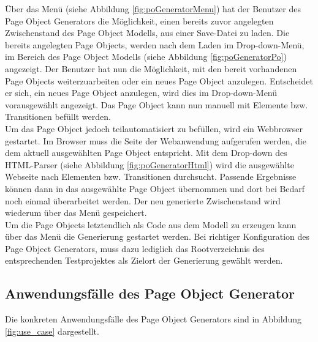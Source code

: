 Über das Menü (siehe Abbildung \ref{fig:poGeneratorMenu}) hat der Benutzer des Page Object Generators die Möglichkeit, einen bereits zuvor angelegten Zwischenstand des Page Object Modells, aus einer Save-Datei zu laden. Die bereits angelegten Page Objects, werden nach dem Laden im Drop-down-Menü, im Bereich des Page Object Modells (siehe Abbildung \ref{fig:poGeneratorPo}) angezeigt. Der Benutzer hat nun die Möglichkeit, mit den bereit vorhandenen Page Objects weiterzuarbeiten oder ein neues Page Object anzulegen. Entscheidet er sich, ein neues Page Object anzulegen, wird dies im Drop-down-Menü vorausgewählt angezeigt. Das Page Object kann nun manuell mit Elemente bzw. Transitionen befüllt werden.\\ Um das Page Object jedoch teilautomatisiert zu befüllen, wird ein Webbrowser gestartet. Im Browser muss die Seite der Webanwendung aufgerufen werden, die dem aktuell ausgewählten Page Object entspricht. Mit dem Drop-down des HTML-Parser (siehe Abbildung \ref{fig:poGeneratorHtml}) wird die ausgewählte Webseite nach Elementen bzw. Transitionen durchsucht.
Passende Ergebnisse können dann in das ausgewählte Page Object übernommen und dort bei Bedarf noch einmal überarbeitet werden.
Der neu generierte Zwischenstand wird wiederum über das Menü gespeichert.\\
Um die Page Objects letztendlich als Code aus dem Modell zu erzeugen kann über das Menü die Generierung gestartet werden. Bei richtiger Konfiguration des Page Object Generators, muss dazu lediglich das Rootverzeichnis des entsprechenden Testprojektes als Zielort der Generierung gewählt werden.


\subsection{Anwendungsfälle des Page Object Generator}
\label{sec:page_object_generator_usecases}

Die konkreten Anwendungsfälle des Page Object Generators sind in Abbildung \ref{fig:use_case} dargestellt.

